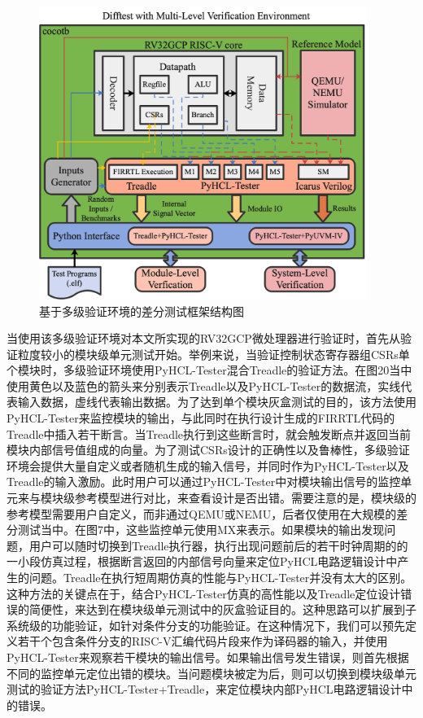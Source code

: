\begin{figure}[htbp]
	\centering
	\includegraphics[width=0.95\textwidth]{Photos/multi-level-ve.png}
	\caption{基于多级验证环境的差分测试框架结构图}
\end{figure}

当使用该多级验证环境对本文所实现的RV32GCP微处理器进行验证时，首先从验证粒度较小的模块级单元测试开始。举例来说，当验证控制状态寄存器组CSRs单个模块时，多级验证环境使用PyHCL-Tester混合Treadle的验证方法。在图20当中使用黄色以及蓝色的箭头来分别表示Treadle以及PyHCL-Tester的数据流，实线代表输入数据，虚线代表输出数据。为了达到单个模块灰盒测试的目的，该方法使用PyHCL-Tester来监控模块的输出，与此同时在执行设计生成的FIRRTL代码的Treadle中插入若干断言。当Treadle执行到这些断言时，就会触发断点并返回当前模块内部信号值组成的向量。为了测试CSRs设计的正确性以及鲁棒性，多级验证环境会提供大量自定义或者随机生成的输入信号，并同时作为PyHCL-Tester以及Treadle的输入激励。此时用户可以通过PyHCL-Tester中对模块输出信号的监控单元来与模块级参考模型进行对比，来查看设计是否出错。需要注意的是，模块级的参考模型需要用户自定义，而非通过QEMU或NEMU，后者仅使用在大规模的差分测试当中。在图7中，这些监控单元使用MX来表示。如果模块的输出发现问题，用户可以随时切换到Treadle执行器，执行出现问题前后的若干时钟周期的的一小段仿真过程，根据断言返回的内部信号向量来定位PyHCL电路逻辑设计中产生的问题。Treadle在执行短周期仿真的性能与PyHCL-Tester并没有太大的区别。这种方法的关键点在于，结合PyHCL-Tester仿真的高性能以及Treadle定位设计错误的简便性，来达到在模块级单元测试中的灰盒验证目的。这种思路可以扩展到子系统级的功能验证，如针对条件分支的功能验证。在这种情况下，我们可以预先定义若干个包含条件分支的RISC-V汇编代码片段来作为译码器的输入，并使用PyHCL-Tester来观察若干模块的输出信号。如果输出信号发生错误，则首先根据不同的监控单元定位出错的模块。当问题模块被定为后，则可以切换到模块级单元测试的验证方法PyHCL-Tester+Treadle，来定位模块内部PyHCL电路逻辑设计中的错误。

